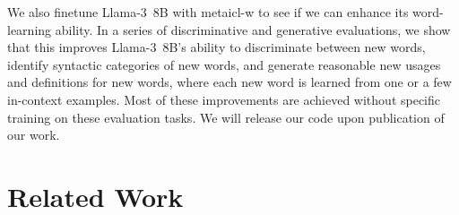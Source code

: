 \documentclass{article}
\begin{document}
We also finetune \mbox{Llama-3 8B} with \ac{metaicl-w} to see if we can enhance its word-learning ability.
In a series of discriminative and generative evaluations, we show that this improves \mbox{Llama-3 8B}'s ability to discriminate between new words, identify syntactic categories of new words, and generate reasonable new usages and definitions for new words, where each new word is learned from one or a few in-context examples.
Most of these improvements are achieved without specific training on these evaluation tasks.
We will release our code upon publication of our work.


\section{Related Work}
\label{sec:related-work}
\end{document}

